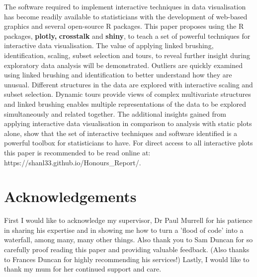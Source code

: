\documentclass[11pt]{book}
\begin{document}


The software required to implement interactive techniques in data visualisation has become readily available to statisticians with the development of web-based graphics and several open-source R packages. This paper proposes using the R packages, \textbf{plotly,} \textbf{crosstalk} and \textbf{shiny}, to teach a set of powerful techniques for interactive data visualisation. The value of applying linked brushing, identification, scaling, subset selection and tours, to reveal further insight during exploratory data analysis will be demonstrated. Outliers are quickly examined using linked brushing and identification to better understand how they are unusual. Different structures in the data are explored with interactive scaling and subset selection. Dynamic tours provide views of complex multivariate structures and linked brushing enables multiple representations of the data to be explored simultaneously and related together. The additional insights gained from applying interactive data visualisation in comparison to analysis with static plots alone, show that the set of interactive techniques and software identified is a powerful toolbox for statisticians to have. 
\vspace{2ex}
\newline 
For direct access to all interactive plots this paper is recommended to be read online at: \newline https://shanl33.github.io/Honours\_Report/.

\newpage



\chapter*{Acknowledgements}    

First I would like to acknowledge my supervisor, Dr Paul Murrell for his patience in sharing his expertise and in showing me how to turn a 'flood of code' into a waterfall, among many, many other things.
\vspace{2ex}
\newline 
Also thank you to Sam Duncan for so carefully proof reading this paper and providing valuable feedback. (Also thanks to Frances Duncan for highly recommending his services!)
\vspace{2ex}
\newline 
Lastly, I would like to thank my mum for her continued support and care.

\newpage

\chapter*{}
  
\end{document}
